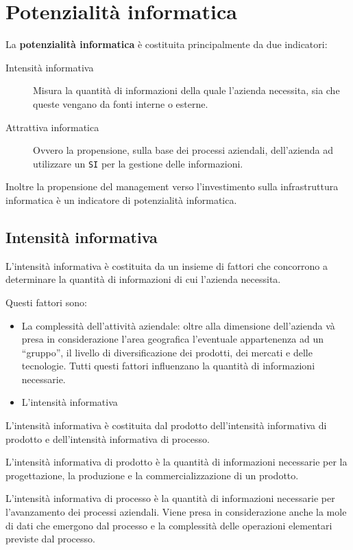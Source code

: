 \section{Potenzialità informatica}
    \begin{definition}
        La \textbf{potenzialità informatica} è costituita principalmente da due indicatori:
        \begin{description}
            \item[Intensità informativa] Misura la quantità di informazioni della quale l'azienda necessita, sia che queste vengano da fonti interne o esterne.
            \item[Attrattiva informatica] Ovvero la propensione, sulla base dei processi aziendali, dell'azienda ad utilizzare un \texttt{SI} per la gestione delle informazioni.
        \end{description}
    \end{definition}
    Inoltre la propensione del management verso l'investimento sulla infrastruttura informatica è un indicatore di potenzialità informatica. 
    \subsection{Intensità informativa}
        \begin{definition}
            L'intensità informativa è costituita da un insieme di fattori che concorrono a determinare la quantità di informazioni di cui l'azienda necessita. 
        \end{definition}
        Questi fattori sono:
        \begin{itemize}
            \item La complessità dell'attività aziendale: oltre alla dimensione dell'azienda và presa in considerazione l'area geografica l'eventuale appartenenza ad un ``gruppo'', il livello di diversificazione dei prodotti, dei mercati e delle tecnologie. Tutti questi fattori influenzano la quantità di informazioni necessarie.
            \item L'intensità informativa
        \end{itemize}
    \begin{definition}
        L'intensità informativa è costituita dal prodotto dell'intensità informativa di prodotto e dell'intensità informativa di processo.
    \end{definition}
    \begin{definition}
        L'intensità informativa di prodotto è la quantità di informazioni necessarie per la progettazione, la produzione e la commercializzazione di un prodotto.
    \end{definition}
    \begin{definition}
        L'intensità informativa di processo è la quantità di informazioni necessarie per l'avanzamento dei processi aziendali. Viene presa in considerazione anche la mole di dati che emergono dal processo e la complessità delle operazioni elementari previste dal processo.
    \end{definition}
